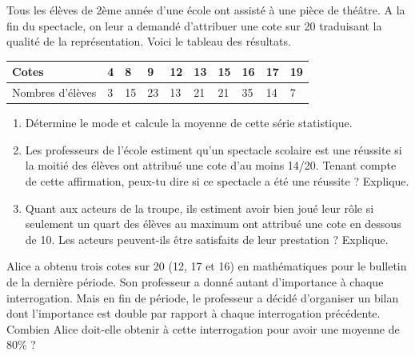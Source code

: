 \documentclass[../math2.tex]{subfiles}
\begin{document}
\vspace*{0.8cm}

\begin{exercise}
    Tous les élèves de 2ème année d’une école ont assisté à une pièce de théâtre. A la fin du spectacle, on leur a demandé d’attribuer une cote sur 20 traduisant la qualité de la représentation. Voici le tableau des résultats.\\
    \begin{tabularx}{\linewidth}{|p{4cm}|Y|Y|Y|Y|Y|Y|Y|Y|Y|}
        \hline
        Cotes & 4 & 8 & 9 & 12 & 13 & 15 & 16 & 17 & 19 \\
         \hline
        Nombres d'élèves & 3 & 15 & 23 & 13 & 21 & 21 & 35 & 14 & 7\\
        \hline
    \end{tabularx}
    \begin{enumerate}[itemsep = 2cm]
        \item Détermine le mode et calcule la moyenne de cette série statistique.
        \item Les professeurs de l’école estiment qu’un spectacle scolaire est une réussite si la moitié des élèves ont attribué une cote d’au moins 14/20. Tenant compte de cette affirmation, peux-tu dire si ce spectacle a été une réussite ? Explique.
        \item Quant aux acteurs de la troupe, ils estiment avoir bien joué leur rôle si seulement un quart des élèves au maximum ont attribué une cote en dessous de 10. Les acteurs peuvent-ils être satisfaits de leur prestation ? Explique.
        
    \end{enumerate}
\end{exercise}

\newpage
\begin{exercise}
Alice a obtenu trois cotes sur 20 (12, 17 et 16) en mathématiques pour le bulletin de la dernière période. Son professeur a donné autant d’importance à chaque interrogation. Mais en fin de période, le professeur a décidé d’organiser un bilan dont l’importance est double par rapport à chaque interrogation précédente. \\ Combien Alice doit-elle obtenir à cette interrogation pour avoir une moyenne de 80\% ?
\end{exercise}

\vspace*{3cm}
\end{document}
